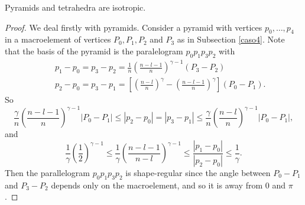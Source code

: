 \begin{proposition} Pyramids and tetrahedra are isotropic.
\end{proposition}
\begin{proof} We deal firstly with pyramids. Consider a pyramid with vertices $p_0, \ldots, p_4$ in a macroelement of vertices $P_0,P_1,P_2$ and $P_3$ as in Subsection \ref{caso4}. Note that the basis of the pyramid is the paralelogram $p_0p_1p_3p_2$ with
\begin{eqnarray}\label{once}
&&p_1-p_0=p_3-p_2=\frac1n\left(\frac{n-l-1}n\right)^{\gamma-1}(P_3-P_2)\\\label{doce} &&p_2-p_0=p_3-p_1=\left[\left(\frac{n-l}n\right)^\gamma-\left(\frac{n-l-1}n\right)^\gamma\right](P_0-P_1).
\end{eqnarray}
So 
\[
\frac{\gamma}{n}\left(\frac{n-l-1}n\right)^{\gamma-1}|P_0-P_1|\le |p_2-p_0|=|p_3-p_1|\le \frac{\gamma}{n}\left(\frac{n-l}n\right)^{\gamma-1}|P_0-P_1|,
\]
and 
\[
\frac1\gamma\left(\frac12\right)^{\gamma-1}\le\frac1\gamma\left(\frac{n-l-1}{n-l}\right)^{\gamma-1}\le\frac{|p_1-p_0|}{|p_2-p_0|}\le \frac1\gamma.
\]
Then the parallelogram $p_0p_1p_3p_2$ is shape-regular since the angle between $P_0-P_1$ and $P_3-P_2$ depends only on the macroelement, and so it is away from $0$ and $\pi$. 


\end{proof}
